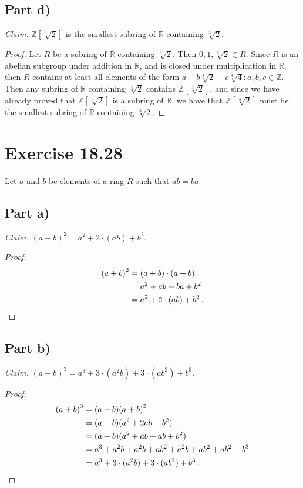 \documentclass{abrice}
\newcommand{\Z}{\mathbb{Z}}
\newcommand{\R}{\mathbb{R}}
\begin{document}
\subsection{Part d)}

\emph{Claim.} $\Z[\sqrt[3]{2}]$ is the smallest subring of $\R$ containing
$\sqrt[3]{2}$.

\begin{proof}
  Let $R$ be a subring of $\R$ containing $\sqrt[3]{2}$. Then $0,1,\sqrt[3]{2}
  \in R$. Since $R$ is an abelian subgroup under addition in $\R$, and is closed
  under multiplication in $\R$, then $R$ contains at least all elements of the
  form $a + b\sqrt[3]{2} + c\sqrt[3]{4} : a,b,c \in \Z$. Then any subring of
  $\R$ containing $\sqrt[3]{2}$ contains $\Z[\sqrt[3]{2}]$, and since we have
  already proved that $\Z[\sqrt[3]{2}]$ is a subring of $\R$, we have that
  $\Z[\sqrt[3]{2}]$ must be the smallest subring of $\R$ containing
  $\sqrt[3]{2}$.
\end{proof}

\section{Exercise 18.28}

Let $a$ and $b$ be elements of a ring $R$ such that $ab = ba$.

\subsection{Part a)}

\emph{Claim.} ${(a + b)}^2 = a^2 + 2 \cdot (ab) + b^2$.

\begin{proof}
  \begin{align*}
    {(a + b)}^2
    &= (a + b) \cdot (a + b) \\
    &= a^2 + ab + ba + b^2 \\
    &= a^2 + 2 \cdot (ab) + b^2\, . \qedhere
  \end{align*}
\end{proof}

\subsection{Part b)}

\emph{Claim.} ${(a + b)}^3 = a^3 + 3 \cdot (a^2b) + 3 \cdot (ab^2) + b^3$.

\begin{proof}
  \begin{align*}
    {(a + b)}^3
    &= (a + b){(a + b)}^2 \\
    &= (a + b)(a^2 + 2ab + b^2) \\
    &= (a + b)(a^2 + ab + ab + b^2) \\
    &= a^3 + a^2 b + a^2 b + a b^2 + a^2 b + a b^2 + a b^2 + b^3 \\
    &= a^3 + 3 \cdot (a^2b) + 3 \cdot (ab^2) + b^3\, . \qedhere
  \end{align*}
\end{proof}
\end{document}
